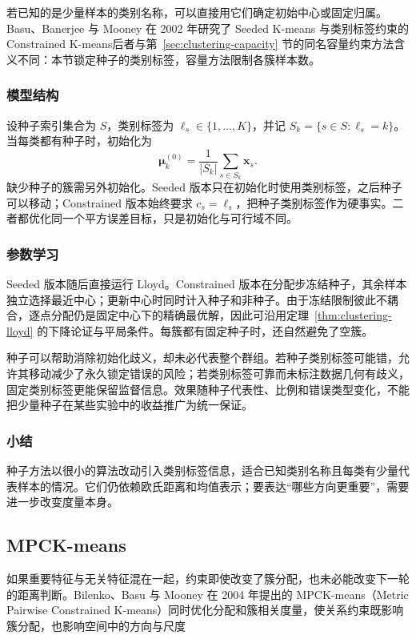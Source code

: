 若已知的是少量样本的类别名称，可以直接用它们确定初始中心或固定归属。Basu、Banerjee 与 Mooney 在 2002 年研究了 Seeded K-means 与类别标签约束的 Constrained K-means后者与第~\ref{sec:clustering-capacity} 节的同名容量约束方法含义不同：本节锁定种子的类别标签，容量方法限制各簇样本数。

\subsubsection{模型结构}

设种子索引集合为 $S$，类别标签为 $\ell_s\in\{1,\ldots,K\}$，并记 $S_k=\{s\in S:\ell_s=k\}$。当每类都有种子时，初始化为
\[
 \bm{\mu}_k^{(0)}
 =\frac{1}{|S_k|}\sum_{s\in S_k}\bm{x}_s.
\]
缺少种子的簇需另外初始化。Seeded 版本只在初始化时使用类别标签，之后种子可以移动；Constrained 版本始终要求 $c_s=\ell_s$，把种子类别标签作为硬事实。二者都优化同一个平方误差目标，只是初始化与可行域不同。

\subsubsection{参数学习}

Seeded 版本随后直接运行 Lloyd。Constrained 版本在分配步冻结种子，其余样本独立选择最近中心；更新中心时同时计入种子和非种子。由于冻结限制彼此不耦合，逐点分配仍是固定中心下的精确最优解，因此可沿用定理~\ref{thm:clustering-lloyd} 的下降论证与平局条件。每簇都有固定种子时，还自然避免了空簇。

种子可以帮助消除初始化歧义，却未必代表整个群组。若种子类别标签可能错，允许其移动减少了永久锁定错误的风险；若类别标签可靠而未标注数据几何有歧义，固定类别标签更能保留监督信息。效果随种子代表性、比例和错误类型变化，不能把少量种子在某些实验中的收益推广为统一保证。

\subsubsection{小结}

种子方法以很小的算法改动引入类别标签信息，适合已知类别名称且每类有少量代表样本的情况。它们仍依赖欧氏距离和均值表示；要表达“哪些方向更重要”，需要进一步改变度量本身。

\subsection{MPCK-means}
\label{sec:clustering-mpck}

如果重要特征与无关特征混在一起，约束即使改变了簇分配，也未必能改变下一轮的距离判断。Bilenko、Basu 与 Mooney 在 2004 年提出的 MPCK-means（Metric Pairwise Constrained K-means）同时优化分配和簇相关度量，使关系约束既影响簇分配，也影响空间中的方向与尺度

